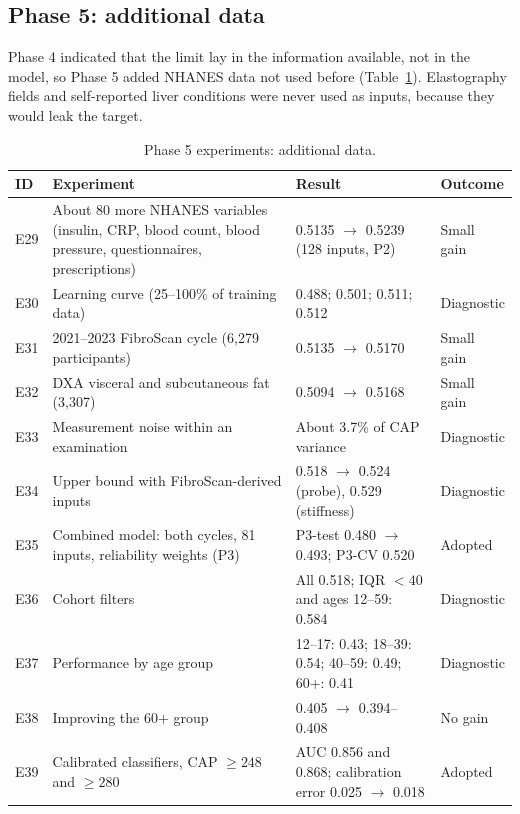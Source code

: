 \subsection{Phase 5: additional data}

Phase 4 indicated that the limit lay in the information available, not in the
model, so Phase 5 added NHANES data not used before
(Table~\ref{tab:exp_p5}). Elastography fields and self-reported liver
conditions were never used as inputs, because they would leak the target.

\begin{table}[htbp]
\centering
\caption{Phase 5 experiments: additional data.}
\label{tab:exp_p5}
\begin{tabular}{p{0.8cm}p{4.2cm}p{5.2cm}p{1.8cm}}
\toprule
ID & Experiment & Result & Outcome \\
\midrule
E29 & About 80 more NHANES variables (insulin, CRP, blood count, blood pressure, questionnaires, prescriptions) & 0.5135 $\rightarrow$ 0.5239 (128 inputs, P2) & Small gain \\
E30 & Learning curve (25--100\% of training data) & 0.488; 0.501; 0.511; 0.512 & Diagnostic \\
E31 & 2021--2023 FibroScan cycle (6,279 participants) & 0.5135 $\rightarrow$ 0.5170 & Small gain \\
E32 & DXA visceral and subcutaneous fat (3,307) & 0.5094 $\rightarrow$ 0.5168 & Small gain \\
E33 & Measurement noise within an examination & About 3.7\% of CAP variance & Diagnostic \\
E34 & Upper bound with FibroScan-derived inputs & 0.518 $\rightarrow$ 0.524 (probe), 0.529 (stiffness) & Diagnostic \\
E35 & Combined model: both cycles, 81 inputs, reliability weights (P3) & P3-test 0.480 $\rightarrow$ 0.493; P3-CV 0.520 & Adopted \\
E36 & Cohort filters & All 0.518; IQR $<40$ and ages 12--59: 0.584 & Diagnostic \\
E37 & Performance by age group & 12--17: 0.43; 18--39: 0.54; 40--59: 0.49; 60+: 0.41 & Diagnostic \\
E38 & Improving the 60+ group & 0.405 $\rightarrow$ 0.394--0.408 & No gain \\
E39 & Calibrated classifiers, CAP $\geq 248$ and $\geq 280$ & AUC 0.856 and 0.868; calibration error 0.025 $\rightarrow$ 0.018 & Adopted \\
\bottomrule
\end{tabular}
\end{table}

